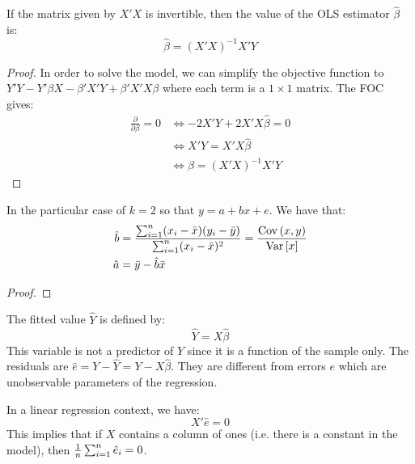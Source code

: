 \begin{remark}
If the matrix given by $X'X$ is invertible, then the value of the OLS estimator $\hat\beta$ is:$$\hat\beta=(X'X)^{-1}X'Y$$
\end{remark}
\begin{proof}
In order to solve the model, we can simplify the objective function to $Y'Y - Y'\beta X - \beta'X'Y + \beta'X'X\beta $ where each term is a $1\times 1$ matrix. The FOC gives:\begin{align*}
\frac{\partial }{\partial \beta} = 0 & \Leftrightarrow -2X'Y + 2X'X\hat\beta = 0 \\ & \Leftrightarrow X'Y=X'X\hat\beta \\ & \Leftrightarrow \hat\beta=(X'X)^{-1}X'Y
\end{align*}
\end{proof}

\begin{remark}
In the particular case of $k=2$ so that $y = a + bx +e$. We have that: \begin{align*}
\hat b & = \frac{\sum_{i=1}^{n}(x_i - \bar x)(y_i - \bar y)}{\sum_{i=1}^{n}(x_i - \bar x)^2}  = \frac{\operatorname{Cov}\left(x,y\right)}{\operatorname{Var}\left[x\right]}\\
\hat a & = \bar y - \hat b \bar x
\end{align*}
\end{remark}

\begin{proof}

\end{proof}

\begin{definition}
The fitted value $\hat{Y}$ is defined by:$$\hat{Y} = X\hat{\beta}$$ This variable is not a predictor of $Y$ since it is a function of the sample only. The residuals are $\hat{e} = Y - \hat{Y} = Y - X\hat{\beta}$. They are different from errors $e$ which are unobservable parameters of the regression.
\end{definition}

\begin{remark}
In a linear regression context, we have: $$X'\hat e = 0$$ This implies that if $X$ contains a column of ones (i.e. there is a constant in the model), then $\frac{1}{n} \sum_{i=1}^{n}\hat e_i = 0$.
\end{remark}

